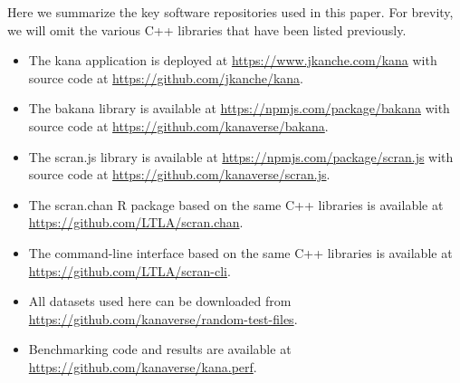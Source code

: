 \documentclass{article}
\begin{document}
Here we summarize the key software repositories used in this paper.
For brevity, we will omit the various C++ libraries that have been listed previously.

\begin{itemize}
\item The kana application is deployed at \url{https://www.jkanche.com/kana} with source code at \url{https://github.com/jkanche/kana}.
\item The bakana library is available at \url{https://npmjs.com/package/bakana} with source code at \url{https://github.com/kanaverse/bakana}.
\item The scran.js library is available at \url{https://npmjs.com/package/scran.js} with source code at \url{https://github.com/kanaverse/scran.js}.
\item The scran.chan R package based on the same C++ libraries is available at \url{https://github.com/LTLA/scran.chan}.
\item The command-line interface based on the same C++ libraries is available at \url{https://github.com/LTLA/scran-cli}.
\item All datasets used here can be downloaded from \url{https://github.com/kanaverse/random-test-files}.
\item Benchmarking code and results are available at \url{https://github.com/kanaverse/kana.perf}.
\end{itemize}



\end{document}
